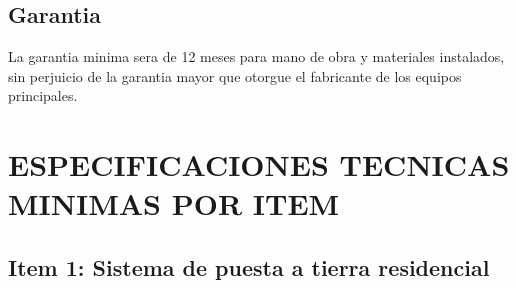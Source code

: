 \documentclass[12pt,letterpaper]{report}
\begin{document}
\subsection{Garantia}

La garantia minima sera de 12 meses para mano de obra y materiales instalados, sin perjuicio de la garantia mayor que otorgue el fabricante de los equipos principales.

\section{ESPECIFICACIONES TECNICAS MINIMAS POR ITEM}

\subsection{Item 1: Sistema de puesta a tierra residencial}
\end{document}
